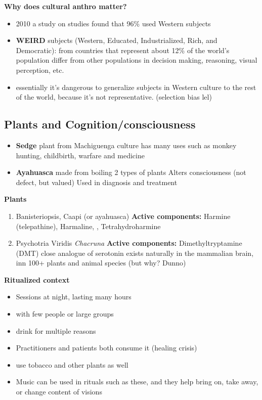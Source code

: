 \documentclass{article}
\begin{document}
\textbf{Why does cultural anthro matter?} 
\begin{itemize}
    \item 2010 a study on studies found that 96\% used Western subjects
    \item \textbf{WEIRD} subjects (Western, Educated, Industrialized, Rich, and Democratic): 
        \subitem from countries that represent about 12\% of the world's population
        \subitem differ from other populations in decision making, reasoning, visual perception, etc. 
    \item essentially it's dangerous to generalize subjects in Western culture to the rest of the world, because it's not representative. (selection bias lel) 
\end{itemize}

\subsection{Plants and Cognition/consciousness}
\begin{itemize}
    \item \textbf{Sedge} plant from Machiguenga culture
        \subitem has many uses such as monkey hunting, childbirth, warfare and medicine
    \item \textbf{Ayahuasca} made from boiling 2 types of plants
        \subitem Alters consciousness (not defect, but valued) 
        \subitem Used in diagnosis and treatment
\end{itemize}

\noindent \textbf{Plants}
\begin{enumerate}
    \item Banisteriopsis, Caapi (or ayahuasca)
        \subitem \textbf{Active components:} Harmine (telepathine), Harmaline, , Tetrahydroharmine
    \item Psychotria Viridis \textit{Chacruna}
        \subitem \textbf{Active components:} Dimethyltryptamine (DMT) 
        \subitem close analogue of serotonin
        \subitem exists naturally in the mammalian brain, inn 100+ plants and animal species (but why? Dunno) 
\end{enumerate}

\textbf{Ritualized context}
\begin{itemize}
    \item Sessions at night, lasting many hours
    \item with few people or large groups
    \item drink for multiple reasons
    \item Practitioners and patients both consume it (healing crisis) 
    \item use tobacco and other plants as well
    \item Music can be used in rituals such as these, and they help bring on, take away, or change content of visions
\end{itemize}
\end{document}
